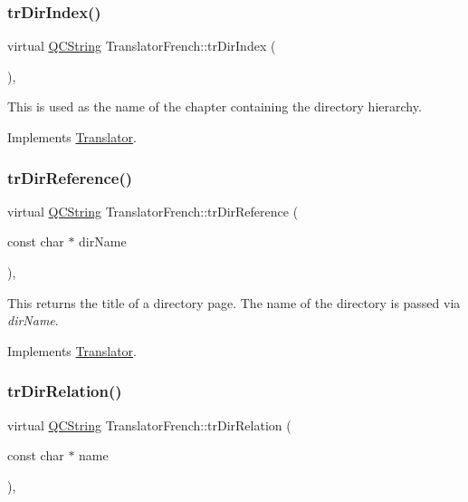 \subsubsection{\texorpdfstring{trDirIndex()}{trDirIndex()}}
{\footnotesize\ttfamily virtual \mbox{\hyperlink{class_q_c_string}{Q\+C\+String}} Translator\+French\+::tr\+Dir\+Index (\begin{DoxyParamCaption}{ }\end{DoxyParamCaption})\hspace{0.3cm}{\ttfamily [inline]}, {\ttfamily [virtual]}}

This is used as the name of the chapter containing the directory hierarchy. 

Implements \mbox{\hyperlink{class_translator}{Translator}}.

\mbox{\label{class_translator_french_a20d49328b162ddd8ba329cec6e149ff6}} 
\subsubsection{\texorpdfstring{trDirReference()}{trDirReference()}}
{\footnotesize\ttfamily virtual \mbox{\hyperlink{class_q_c_string}{Q\+C\+String}} Translator\+French\+::tr\+Dir\+Reference (\begin{DoxyParamCaption}\item[{const char $\ast$}]{dir\+Name }\end{DoxyParamCaption})\hspace{0.3cm}{\ttfamily [inline]}, {\ttfamily [virtual]}}

This returns the title of a directory page. The name of the directory is passed via {\itshape dir\+Name}. 

Implements \mbox{\hyperlink{class_translator}{Translator}}.

\mbox{\label{class_translator_french_a9571394c4e8914d9035479d0a4a26cee}} 
\subsubsection{\texorpdfstring{trDirRelation()}{trDirRelation()}}
{\footnotesize\ttfamily virtual \mbox{\hyperlink{class_q_c_string}{Q\+C\+String}} Translator\+French\+::tr\+Dir\+Relation (\begin{DoxyParamCaption}\item[{const char $\ast$}]{name }\end{DoxyParamCaption})\hspace{0.3cm}{\ttfamily [inline]}, {\ttfamily [virtual]}}

